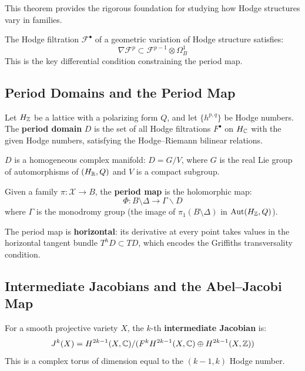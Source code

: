 This theorem provides the rigorous foundation for studying how Hodge structures vary in families.

\begin{theorem}
The Hodge filtration $\mathcal{F}^\bullet$ of a geometric variation of Hodge structure satisfies:
\[
\nabla \mathcal{F}^p \subset \mathcal{F}^{p-1} \otimes \Omega_B^1
\]
This is the key differential condition constraining the period map.
\end{theorem}

\subsection{Period Domains and the Period Map}

\begin{definition}
Let $H_{\mathbb{Z}}$ be a lattice with a polarizing form $Q$, and let $\{h^{p,q}\}$ be Hodge numbers. The \textbf{period domain} $D$ is the set of all Hodge filtrations $F^\bullet$ on $H_{\mathbb{C}}$ with the given Hodge numbers, satisfying the Hodge--Riemann bilinear relations.
\end{definition}

$D$ is a homogeneous complex manifold: $D = G/V$, where $G$ is the real Lie group of automorphisms of $(H_{\mathbb{R}}, Q)$ and $V$ is a compact subgroup.

\begin{definition}
Given a family $\pi: \mathcal{X} \to B$, the \textbf{period map} is the holomorphic map:
\[
\Phi: B \setminus \Delta \to \Gamma \backslash D
\]
where $\Gamma$ is the monodromy group (the image of $\pi_1(B \setminus \Delta)$ in $\operatorname{Aut}(H_{\mathbb{Z}}, Q)$).
\end{definition}

\begin{theorem}
The period map is \textbf{horizontal}: its derivative at every point takes values in the horizontal tangent bundle $T^h D \subset T D$, which encodes the Griffiths transversality condition.
\end{theorem}

\subsection{Intermediate Jacobians and the Abel--Jacobi Map}

\begin{definition}
For a smooth projective variety $X$, the $k$-th \textbf{intermediate Jacobian} is:
\[
J^k(X) = H^{2k-1}(X, \mathbb{C}) / (F^k H^{2k-1}(X, \mathbb{C}) \oplus H^{2k-1}(X, \mathbb{Z}))
\]
This is a complex torus of dimension equal to the $(k-1, k)$ Hodge number.
\end{definition}

